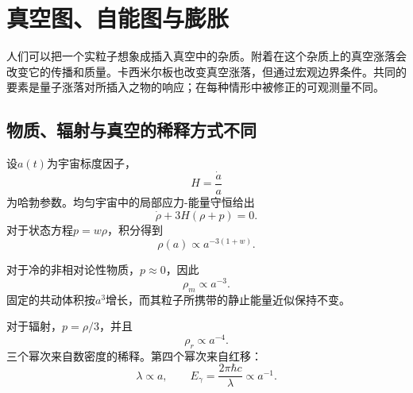\section{真空图、自能图与膨胀}

\begin{classroomqa}
\end{classroomqa}

人们可以把一个实粒子想象成插入真空中的杂质。附着在这个杂质上的真空涨落会改变它的传播和质量。卡西米尔板也改变真空涨落，但通过宏观边界条件。共同的要素是量子涨落对所插入之物的响应；在每种情形中被修正的可观测量不同。

\vspace{-2pt}
\subsection{物质、辐射与真空的稀释方式不同}

设\(a(t)\)为宇宙标度因子，
\begin{equation}
H=\frac{\dot a}{a}
\end{equation}
为哈勃参数。均匀宇宙中的局部应力-能量守恒给出
\begin{equation}
\dot\rho+3H(\rho+p)=0.
\end{equation}
对于状态方程\(p=w\rho\)，积分得到
\begin{equation}
\rho(a)\propto a^{-3(1+w)}.
\end{equation}

对于冷的非相对论性物质，\(p\approx0\)，因此
\begin{equation}
\rho_m\propto a^{-3}.
\end{equation}
固定的共动体积按\(a^3\)增长，而其粒子所携带的静止能量近似保持不变。

对于辐射，\(p=\rho/3\)，并且
\begin{equation}
\rho_r\propto a^{-4}.
\end{equation}
三个幂次来自数密度的稀释。第四个幂次来自红移：
\begin{equation}
\lambda\propto a,
\qquad
E_\gamma=\frac{2\pi\hbar c}{\lambda}\propto a^{-1}.
\end{equation}

\begin{classroomqa}
\end{classroomqa}

